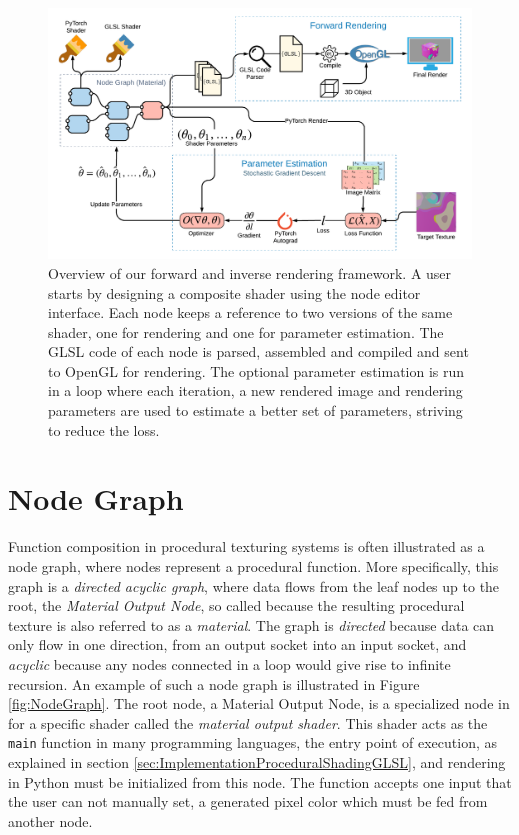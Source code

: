 \begin{figure}[h]
    \centering
    \includegraphics[width=1.0\textwidth]{img/method/System Overview.pdf}
    \caption{Overview of our forward and inverse rendering framework. A user starts by designing a composite shader using the node editor interface. Each node keeps a reference to two versions of the same shader, one for rendering and one for parameter estimation. The GLSL code of each node is parsed, assembled and compiled and sent to OpenGL for rendering. The optional parameter estimation is run in a loop where each iteration, a new rendered image and rendering parameters are used to estimate a better set of parameters, striving to reduce the loss.}
    \label{fig:SystemOverview}
\end{figure}

\section{Node Graph}

Function composition in procedural texturing systems is often illustrated as a node graph, where nodes represent a procedural function. More specifically, this graph is a \textit{directed acyclic graph}, where data flows from the leaf nodes up to the root, the \textit{Material Output Node}, so called because the resulting procedural texture is also referred to as a \textit{material}. The graph is \textit{directed} because data can only flow in one direction, from an output socket into an input socket, and \textit{acyclic} because any nodes connected in a loop would give rise to infinite recursion. An example of such a node graph is illustrated in Figure \ref{fig:NodeGraph}. The root node, a Material Output Node, is a specialized node in \dipter{} for a specific shader called the \textit{material output shader}. This shader acts as the \texttt{main} function in many programming languages, the entry point of execution, as explained in section \ref{sec:ImplementationProceduralShadingGLSL}, and rendering in Python must be initialized from this node. The function accepts one input that the user can not manually set, a generated pixel color which must be fed from another node.

